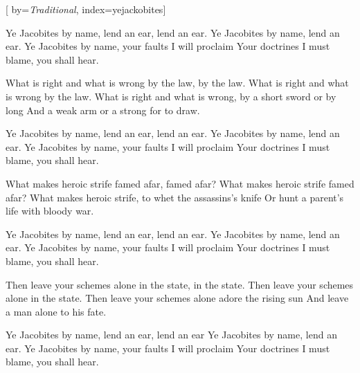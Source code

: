 
[%
    by={\textit{Traditional}},
    index={yejackobites}]


    \label{yejackobites}

    \beginchorus
        Ye Jacobites by name, lend an ear, lend an ear.
        Ye Jacobites by name, lend an ear.
        Ye Jacobites by name, your faults I will proclaim
        Your doctrines I must blame, you shall hear.
    \endchorus

    \beginverse
        What is right and what is wrong by the law, by the law.
        What is right and what is wrong by the law.
        What is right and what is wrong, by a short sword or by long
        And a weak arm or a strong for to draw.
    \endverse

    \beginchorus
        Ye Jacobites by name, lend an ear, lend an ear.
        Ye Jacobites by name, lend an ear.
        Ye Jacobites by name, your faults I will proclaim
        Your doctrines I must blame, you shall hear.
    \endchorus

    \beginverse
        What makes heroic strife famed afar, famed afar?
        What makes heroic strife famed afar?
        What makes heroic strife, to whet the assassins's knife
        Or hunt a parent's life with bloody war.
    \endverse

    \beginchorus
        Ye Jacobites by name, lend an ear, lend an ear.
        Ye Jacobites by name, lend an ear.
        Ye Jacobites by name, your faults I will proclaim
        Your doctrines I must blame, you shall hear.
    \endchorus

    \beginverse
        Then leave your schemes alone in the state, in the state.
        Then leave your schemes alone in the state.
        Then leave your schemes alone adore the rising sun
        And leave a man alone to his fate.
    \endverse

    \beginchorus
        Ye Jacobites by name, lend an ear, lend an ear
        Ye Jacobites by name, lend an ear.
        Ye Jacobites by name, your faults I will proclaim
        Your doctrines I must blame, you shall hear.
    \endchorus
\endsong
